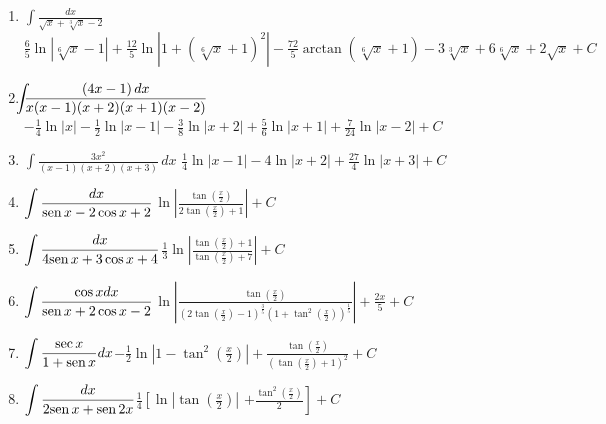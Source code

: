{\begin{enumerate}
\item {$\displaystyle{\int \frac{dx}{\sqrt{x}+\sqrt[3]{x}-2}}$}{$\frac{6}{5}\ln \left\vert \sqrt[6]{x}-1\right\vert +\frac{12}{5}\ln
\left\vert 1+\left( \sqrt[6]{x}+1\right) ^{2}\right\vert -\frac{72}{5}%
\arctan \left( \sqrt[6]{x}+1\right) -3\sqrt[3]{x}+6\sqrt[6]{x}+2\sqrt{x}+C
$}

\item {$\hspace{-0.2cm}\displaystyle{\int\hspace{-0.2cm} \frac{(4x-1)\, dx}{x(x-1)(x+2)(x+1)(x-2)}}$}{$-\frac{1}{4}\ln \left\vert x\right\vert -\frac{1}{2}\ln \left\vert
x-1\right\vert -\frac{3}{8}\ln \left\vert x+2\right\vert +\frac{5}{6}\ln
\left\vert x+1\right\vert +\frac{7}{24}\ln \left\vert x-2\right\vert +C$}

\item {$\displaystyle{\int \frac{3x^{2}}{(x-1)(x+2)(x+3)}\, dx}$}{ $\frac{1}{4}\ln \left\vert x-1\right\vert -4\ln \left\vert x+2\right\vert +
\frac{27}{4}\ln \left\vert x+3\right\vert +C$}

\item {$\displaystyle \int \frac{dx}{\text{\rm sen}\, x-2\cos x+2}$}{$\ln \left\vert \frac{\tan (\frac{x}{2})}{2\tan (\frac{x}{2})+1}%
\right\vert +C$}

\item {$\displaystyle \int \frac{dx}{4\text{\rm sen}\, x+3\cos x+4}$}{$\frac{1}{3}\ln \left\vert \frac{\tan (\frac{x}{2})+1}{\tan (\frac{x}{2}%
)+7}\right\vert +C$}

\item {$\displaystyle \int \frac{\cos xdx}{\text{\rm sen}\, x+2\cos
x-2}$}{$\ln \left\vert \frac{\tan \left( \frac{x}{2}\right) }{\left( 2\tan (\frac{x%
}{2})-1\right) ^{\frac{3}{5}}\left( 1+\tan ^{2}(\frac{x}{2})\right) ^{\frac{1%
}{5}}}\right\vert +\frac{2x}{5}+C$}

\item {$\displaystyle\int \frac{\sec x}{1+\text{\rm sen}\, x}dx$}{$-\frac{1}{2}\ln \left\vert 1-\tan ^{2}(\frac{x}{2})\right\vert +\frac{\tan (%
\frac{x}{2})}{\left( \tan (\frac{x}{2})+1\right) ^{2}}+C$}
	
\item {$\displaystyle\int \frac{dx}{2\text{\rm sen}\, x+\text{\rm sen}\, 2x}$}{$\frac{1}{4}\left[\ln \left\vert\tan(\frac{x}{2})\right\vert\right.$ \linebreak$\left.+\frac{\tan^{2}(\frac{x}{2})}{2}\right] +C$}


\end{enumerate}}

